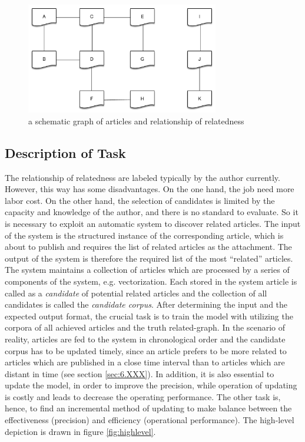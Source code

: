 \begin{figure}[!htb]
    \centering
    \includegraphics[width=0.75\textwidth]{fig/relatedness.pdf}
    \caption{a schematic graph of articles and relationship of relatedness}
    \label{fig:relatedness}
\end{figure}


\subsection{Description of Task}
\label{sec:3.2}

The relationship of relatedness are labeled typically by the author currently. However, this way has some disadvantages. On the one hand, the job need more labor cost. On the other hand, the selection of candidates is limited by the capacity and knowledge of the author, and there is no standard to evaluate. So it is necessary to exploit an automatic system to discover related articles. The input of the system is the structured instance of the corresponding article, which is about to publish and requires the list of related articles as the attachment. The output of the system is therefore the required list of the most ``related'' articles. The system maintains a collection of articles which are processed by a series of components of the system, e.g. vectorization. Each stored in the system article is called as a \textit{candidate} of potential related articles and the collection of all candidates is called the \textit{candidate corpus}. After determining the input and the expected output format, the crucial task is to train the model with utilizing the corpora of all achieved articles and the truth related-graph. In the scenario of reality, articles are fed to the system in chronological order and the candidate corpus has to be updated timely, since an article prefers to be more related to articles which are published in a close time	interval than to articles which are distant in time (see section \ref{sec:6.XXX}). In addition, it is also essential to update the model, in order to improve the precision, while operation of updating is costly and leads to decrease the operating performance. The other task is, hence, to find an incremental method of updating to make balance between the effectiveness (precision) and efficiency (operational performance). The high-level depiction is drawn in figure \ref{fig:highlevel}. 

